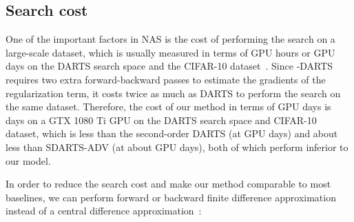 \documentclass{article} \usepackage{fancyhdr, iclr2023_conference, times}
\newcommand{\mydarts}{-DARTS\xspace}
\begin{document}
\subsection{Search cost}
\label{sec:appndx-search-cost}
\par One of the important factors in NAS is the cost of performing the search on a large-scale dataset, which is usually measured in terms of GPU hours or GPU days on the DARTS search space and the CIFAR-10 dataset~\citep{DBLP:journals/jmlr/ElskenMH19}. Since \mydarts requires two extra forward-backward passes to estimate the gradients of the regularization term, it costs twice as much as DARTS to perform the search on the same dataset. Therefore, the cost of our method in terms of GPU days is  days on a GTX 1080 Ti GPU on the DARTS search space and CIFAR-10 dataset, which is  less than the second-order DARTS (at  GPU days) and about  less than SDARTS-ADV (at about  GPU days), both of which perform inferior to our model.
\par In order to reduce the search cost and make our method comparable to most baselines, we can perform forward or backward finite difference approximation instead of a central difference approximation~\citep{DBLP:journals/corr/abs-2009-07098}:
\end{document}
